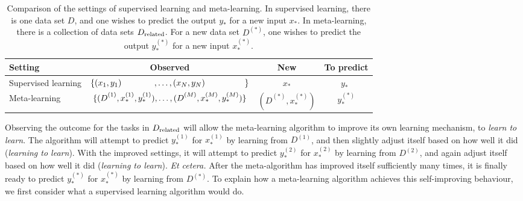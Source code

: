 \documentclass[12pt, twoside]{report}
\begin{document}
\begin{table}[t]
    \centering
    \small
    \caption[
        Comparison of supervised learning and meta-learning
    ]
    {
        Comparison of the settings of supervised learning and meta-learning.
        In supervised learning, there is one data set $D$, and one wishes to predict the output $y_*$ for a new input $x_*$.
        In meta-learning, there is a collection of data sets $D\ss{related}$.
        For a new data set $D^{(*)}$, one wishes
        to predict the output $y_*^{(*)}$ for a new input $x_*^{(*)}$.
    }
    \label{tab:supervised_vs_meta-learning}
    \begin{tabular}{lccc}
        \toprule       
        Setting & Observed & New & To predict \\ \midrule
        Supervised learning
        & $\{
            (x_1, y_1) \hspace{39pt},
            \ldots,
            (x_N, y_N)\hspace{47pt}
        \}$
        & $x_*$ 
        & $y_*\hspace{5pt}$ \\
        Meta-learning
        & $\displaystyle\{
            (D^{(1)}_{\phantom{*}}, x_*^{(1)}, y_*^{(1)}),
            \ldots,
            (D^{(M)}_{\phantom{*}}, x_*^{(M)}, y_*^{(M)})
        \}$
        & $\displaystyle(D^{(*)}_{\phantom{*}}, x_*^{(*)})$ 
        & $y_*^{(*)}$ \\  
        \bottomrule
    \end{tabular}
\end{table}

Observing the outcome for
the tasks in $D\ss{related}$ will allow the meta-learning algorithm to improve its own learning mechanism, to \emph{learn to learn}.
The algorithm will attempt to predict $\displaystyle y^{(1)}_*$
for $\displaystyle x^{(1)}_*$ by learning from $\displaystyle D^{(1)}$,
and then slightly adjust itself based on how well it did (\emph{learning to learn}).
With the improved settings, it will attempt to predict $\displaystyle y^{(2)}_*$
for $\displaystyle x^{(2)}_*$
by learning from $\displaystyle D^{(2)}$,
and again adjust itself based on how well it did (\emph{learning to learn}).
\textit{Et cetera.}
After the meta-algorithm has improved itself sufficiently many times, it is finally ready to predict $\displaystyle y^{(*)}_*$ for $\displaystyle x_*^{(*)}$ by learning from $\displaystyle D^{(*)}$.
To explain how a meta-learning algorithm achieves this self-improving behaviour, we first consider what a supervised learning algorithm would do.
\end{document}
